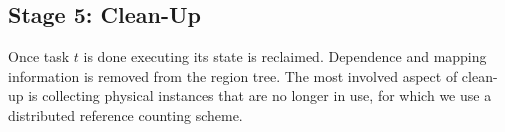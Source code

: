 \subsection{Stage 5: Clean-Up}
\label{sec:clean}

Once task $t$ is done executing its state is reclaimed. Dependence
and mapping information is removed from the region tree.  The most involved aspect of
clean-up is collecting physical instances that are no longer in use,
for which we use a distributed reference counting scheme.


